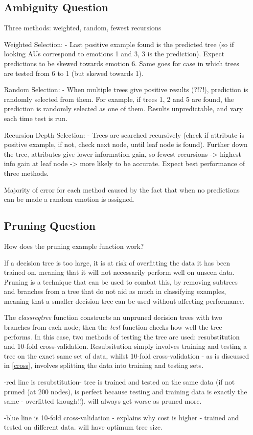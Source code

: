 \documentclass[a4paper,11pt]{article}
\begin{document}
\subsection{Ambiguity Question} \label{ambiguity}

Three methods: weighted, random, fewest recursions

Weighted Selection:
	- Last positive example found is the predicted tree (so if looking AUs correspond to emotions 1 and 3, 3 is the prediction). Expect predictions to be skewed towards emotion 6. Same goes for case in which trees are tested from 6 to 1 (but skewed towards 1).
	
Random Selection:
	- When multiple trees give positive results (?!?!), prediction is randomly selected from them. For example, if trees 1, 2 and 5 are found, the prediction is randomly selected as one of them. Results unpredictable, and vary each time test is run.
	
Recursion Depth Selection:
	- Trees are searched recursively (check if attribute is positive example, if not, check next node, until leaf node is found). Further down the tree, attributes give lower information gain, so fewest recursions -> highest info gain at leaf node -> more likely to be accurate. Expect best performance of three methods.
	
Majority of error for each method caused by the fact that when no predictions can be made a random emotion is assigned.

\subsection{Pruning Question}

How does the pruning example function work? 

If a decision tree is too large, it is at risk of overfitting the data it has been trained on, meaning that it will not necessarily perform well on unseen data. Pruning is a technique that can be used to combat this, by removing subtrees and branches from a tree that do not aid as much in classifying examples, meaning that a smaller decision tree can be used without affecting performance. 

The \textit{classregtree} function constructs an unpruned decision trees with two branches from each node; then the \textit{test} function checks how well the tree performs. In this case, two methods of testing the tree are used: resubstitution and 10-fold cross-validation. Resubsitution simply involves training and testing a tree on the exact same set of data, whilst 10-fold cross-validation - as is discussed in \ref{cross}, involves splitting the data into training and testing sets.

-red line is resubstitution- tree is trained and tested on the same
 data (if not pruned (at 200 nodes), is perfect because testing and
 training data is exactly the same - overfitted though!!). will always
 get worse as pruned more.

-blue line is 10-fold cross-validation - explains why cost is higher -
 trained and tested on different data. will have optimum tree size.



\end{document}
